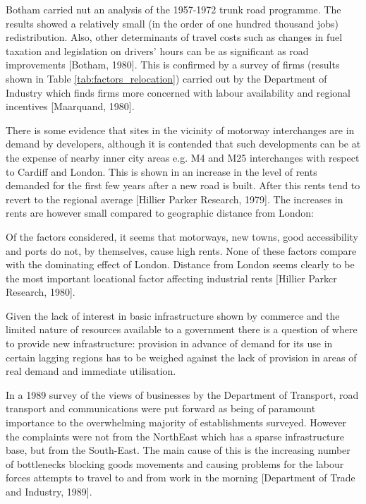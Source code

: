 Botham carried nut an analysis of the 1957-1972 trunk road programme. The results showed a relatively small (in the order of one hundred thousand jobs) redistribution. Also, other determinants of travel costs such as changes in fuel taxation and legislation on drivers' hours can be as significant as road improvements [Botham, 1980]. This is confirmed by a survey of firms (results shown in Table \ref{tab:factors_relocation}) carried out by the Department of Industry which finds firms more concerned with labour availability and regional incentives [Maarquand, 1980].



There is some evidence that sites in the vicinity of motorway interchanges are in demand by developers, although it is contended that such developments can be at the expense of nearby inner city areas e.g. M4 and M25 interchanges with respect to Cardiff and London. This is shown in an increase in the level of rents demanded for the first few years after a new road is built. After this rents tend to revert to the regional average [Hillier Parker Research, 1979]. The increases in rents are however small compared to geographic distance from London:

\begin{displayquote}
Of the factors considered, it seems that motorways, new towns, good accessibility and ports do not, by themselves, cause high rents. None of these factors compare with the dominating effect of London. Distance from London seems clearly to be the most important locational factor affecting industrial rents [Hillier Parkcr Research, 1980].
\end{displayquote}

Given the lack of interest in basic infrastructure shown by commerce and the limited nature of resources available to a government there is a question of where to provide new infrastructure: provision in advance of demand for its use in certain lagging regions has to be weighed against the lack of provision in areas of real demand and immediate utilisation.

In a 1989 survey of the views of businesses by the Department of Transport, road transport and communications were put forward as being of paramount importance to the overwhelming majority of establishments surveyed. However the complaints were not from the NorthEast which has a sparse infrastructure base, but from the South-East. The main cause of this is the increasing number of bottlenecks blocking goods movements and causing problems for the labour forces attempts to travel to and from work in the morning [Department of Trade and Industry, 1989].

